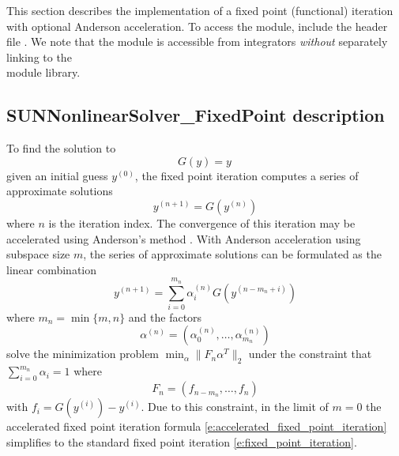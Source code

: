 This section describes the {\sunnonlinsol} implementation of a fixed point
(functional) iteration with optional Anderson acceleration. To access the
{\sunnonlinsolfixedpoint} module, include the header file
. We note that the
{\sunnonlinsolfixedpoint} module is accessible from {\sundials} integrators
\textit{without} separately linking to the\\
\noindent{} module library. 

\subsection{SUNNonlinearSolver\_FixedPoint description}
\label{ss:sunnonlinsolfixedpoint_math}

To find the solution to
\begin{equation}\label{e:fixed_point_sys}
  G(y) = y \, 
\end{equation}
given an initial guess $y^{(0)}$, the fixed point iteration computes a series of
approximate solutions
\begin{equation}\label{e:fixed_point_iteration}
  y^{(n+1)} = G(y^{(n)})
\end{equation}
where $n$ is the iteration index. The convergence of this iteration may be
accelerated using Anderson's method \cite{Anderson65, Walker-Ni09, Fang-Saad09,
LWWY11}. With Anderson acceleration using subspace size $m$, the series of
approximate solutions can be formulated as the linear combination
\begin{equation}\label{e:accelerated_fixed_point_iteration}
  y^{(n+1)} = \sum_{i=0}^{m_n} \alpha_i^{(n)} G(y^{(n-m_n+i)})
\end{equation}
where $m_n = \min\{m,n\}$ and the factors
\begin{equation}
\alpha^{(n)} =(\alpha_0^{(n)}, \ldots, \alpha_{m_n}^{(n)})
\end{equation}
solve the minimization problem $\min_\alpha  \| F_n \alpha^T \|_2$ under the
constraint that $\sum_{i=0}^{m_n} \alpha_i = 1$ where 
\begin{equation}
F_{n} = (f_{n-m_n}, \ldots, f_{n}) 
\end{equation}
with $f_i = G(y^{(i)}) - y^{(i)}$. Due to this constraint, in the limit of $m=0$
the accelerated fixed point iteration formula
\eqref{e:accelerated_fixed_point_iteration} simplifies to the standard
fixed point iteration \eqref{e:fixed_point_iteration}.

